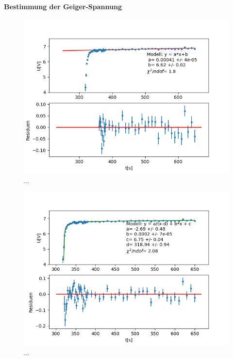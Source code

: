 \documentclass[12pt,a4paper]{article}
\begin{document}
\paragraph{Bestimmung der Geiger-Spannung}
\begin{figure}
\centering
\includegraphics[scale=1]{Bilder/GMGeradenfit.PNG}
\caption{...}
\label{fig:GMGeradenfit}
\end{figure}

\begin{figure}
\centering
\includegraphics[scale=1]{Bilder/GMKurvenfit.PNG}
\caption{...}
\label{fig:GMKurvenfit}
\end{figure}
\end{document}
